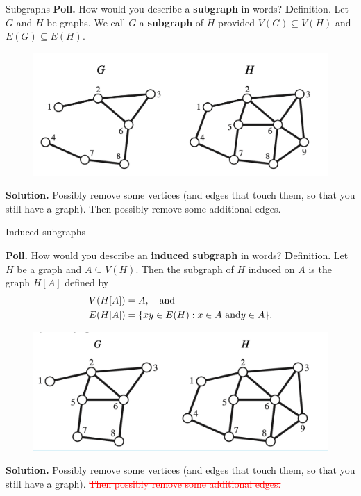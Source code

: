 \documentclass[10pt]{beamer}
\begin{document}
\begin{frame}{Subgraphs}
\small 
\colorbox{yellow!30}{\textbf{Poll.}} How would you describe a \textbf{subgraph} in words?
\vfill
\pause 
\colorbox{green!30}{\textbf Definition.} Let $G$ and $H$ be graphs.  We call $G$ a \textbf{subgraph} of $H$ provided $V(G) \subseteq V(H)$ and $E(G) \subseteq E(H)$. 
\vfill 
\pause 
\begin{mygreenbox}[title=\text{Example: G is a \textbf{subgraph} of H}]
\begin{figure}
\includegraphics[width=\textwidth]{images/subgraph_general.png}
\end{figure}	
\end{mygreenbox}
\vfill 
\pause 
\colorbox{red!30}{\textbf{Solution.}} Possibly remove some vertices (and edges that touch them, so that you still have a graph).  Then possibly remove some additional edges.	
\end{frame}


\begin{frame}{Induced subgraphs}
\small 

\colorbox{yellow!30}{\textbf{Poll.}} How would you describe an \textbf{induced subgraph} in words?
\vfill
\pause 
\colorbox{green!30}{\textbf Definition.} Let $H$ be a graph and $A \subseteq V(H)$.  Then the subgraph of $H$ induced on $A$ is the graph $H[A]$ defined by
%
\begin{align*}
V(H[A]) &= A, \quad \text{and} \\
E(H[A]) &= \{ {xy \in E(H) : x \in A \text{ and} y \in A} \}.	
\end{align*}

\vfill 
\pause 
\begin{mygreenbox}[title=\text{Example: G is an \textbf{induced subgraph} of H}]
\begin{figure}
\includegraphics[width=.7\textwidth]{images/subgraph_induced.png}
\end{figure}	
\end{mygreenbox}
\vfill 
\pause 
\colorbox{red!30}{\textbf{Solution.}} Possibly remove some vertices (and edges that touch them, so that you still have a graph).  \textcolor{red}{\sout{Then possibly remove some additional edges.}}	
\end{frame}
\end{document}

